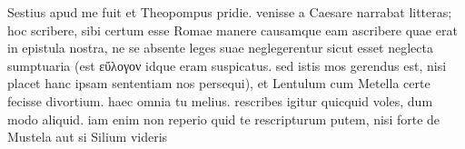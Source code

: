 


 Sestius apud me fuit et Theopompus pridie. venisse a Caesare narrabat litteras; hoc scribere, sibi certum esse Romae manere causamque eam ascribere quae erat in epistula nostra, ne se absente leges suae neglegerentur sicut esset neglecta sumptuaria (est εὔλογον idque eram suspicatus. sed istis mos gerendus est, nisi placet hanc ipsam sententiam nos persequi), et Lentulum cum Metella certe fecisse divortium. haec omnia tu melius. rescribes igitur quicquid voles, dum modo aliquid. iam enim non reperio quid te rescripturum putem, nisi forte de Mustela aut si Silium videris
